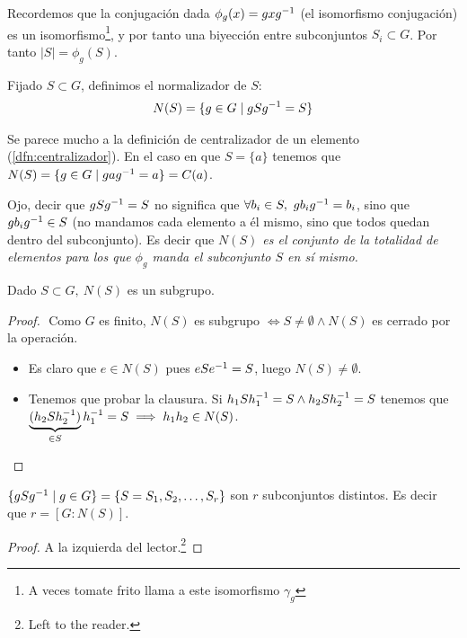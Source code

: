 Recordemos que la conjugación dada $\phi_g(x) = gxg^{-1}$ (el isomorfismo conjugación) es un isomorfismo\footnote{A veces tomate frito llama a este isomorfismo $\gamma_g$}, y por tanto una biyección entre subconjuntos $S_i \subset G$. Por tanto $|S| = \phi_g(S)$.

\begin{dfn}
	\label{dfn:normalizador}
	Fijado $S \subset G$, definimos el normalizador de $S$:
	\begin{align}
	N(S) = \{g \in G \mid gSg^{-1} = S\}
	\end{align} 
\end{dfn}

Se parece mucho a la definición de centralizador de un elemento (\ref{dfn:centralizador}). En el caso en que $S = \{a\}$ tenemos que $N(S) = \{g \in G \mid gag^{-1} = a\} = C(a)$.

Ojo, decir que $gSg^{-1} = S$ no significa que $\forall b_i \in S,\ gb_ig^{-1} = b_i$, sino que $gb_ig^{-1} \in S$ (no mandamos cada elemento a él mismo, sino que todos quedan dentro del subconjunto). Es decir que \textit{$N(S)$ es el conjunto de la totalidad de elementos para los que $\phi_g$ manda el subconjunto $S$ en sí mismo.}

\begin{pro}
	Dado $S \subset G,\ N(S)$ es un subgrupo.
\end{pro}

\begin{proof}$ $\newline
	Como $G$ es finito, $N(S)$ es subgrupo $\iff S \neq \emptyset \land N(S)$ es cerrado por la operación.
	\begin{itemize}
		\item Es claro que $e \in N(S)$ pues $eSe^{-1} = S$, luego $N(S) \neq \emptyset$.
		\item Tenemos que probar la clausura. Si $h_1Sh_1^{-1} = S \land h_2Sh_2^{-1} = S$ tenemos que $\underbrace{(h_2Sh_2^{-1})}_{\in S}h_1^{-1} = S \implies h_1h_2 \in N(S)$.
	\end{itemize}
\end{proof}

\begin{pro}
	\label{pro:propiedad2Ns}
	$\{gSg^{-1} \mid g \in G\} = \{S = S_1, S_2, \dots, S_r\}$ son $r$ subconjuntos distintos. Es decir que $r = [G: N(S)]$.
\end{pro}

\begin{proof}
	A la izquierda del lector.\footnote{Left to the reader.}
\end{proof}

